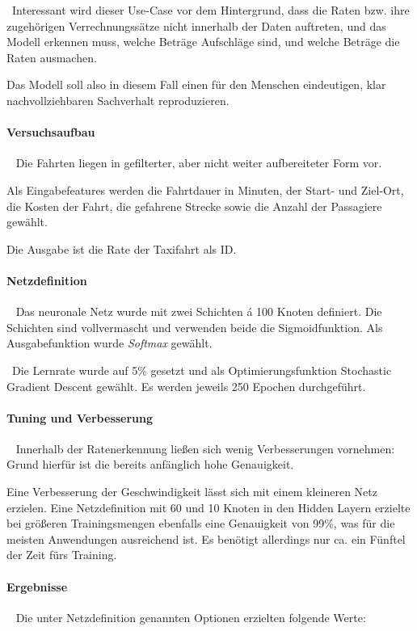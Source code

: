 ~\newline Interessant wird dieser Use-Case vor dem Hintergrund, dass die Raten bzw. ihre zugehörigen Verrechnungssätze nicht innerhalb der Daten auftreten, und das Modell erkennen muss, welche Beträge Aufschläge sind, und welche Beträge die Raten ausmachen. 

Das Modell soll also in diesem Fall einen für den Menschen eindeutigen, klar nachvollziehbaren Sachverhalt reproduzieren. 
\paragraph{Versuchsaufbau} ~\newline
Die Fahrten liegen in gefilterter, aber nicht weiter aufbereiteter Form vor. 

Als Eingabefeatures werden die Fahrtdauer in Minuten, der Start- und Ziel-Ort, die Kosten der Fahrt, die gefahrene Strecke sowie die Anzahl der Passagiere gewählt. 

Die Ausgabe ist die Rate der Taxifahrt als ID.
\paragraph{Netzdefinition} ~\newline
Das neuronale Netz wurde mit zwei Schichten á 100 Knoten definiert. Die Schichten sind vollvermascht und verwenden beide die Sigmoidfunktion. Als Ausgabefunktion wurde \textit{Softmax} gewählt.

~\newline Die Lernrate wurde auf 5\% gesetzt und als Optimierungsfunktion Stochastic Gradient Descent gewählt. Es werden jeweils 250 Epochen durchgeführt. 
\paragraph{Tuning und Verbesserung} ~\newline
Innerhalb der Ratenerkennung ließen sich wenig Verbesserungen vornehmen: Grund hierfür ist die bereits anfänglich hohe Genauigkeit. 

Eine Verbesserung der Geschwindigkeit lässt sich mit einem kleineren Netz erzielen. Eine Netzdefinition mit 60 und 10 Knoten in den Hidden Layern erzielte bei größeren Trainingsmengen ebenfalls eine Genauigkeit von 99\%, was für die meisten Anwendungen ausreichend ist. Es benötigt allerdings nur ca. ein Fünftel der Zeit fürs Training.
\paragraph{Ergebnisse} ~\newline
Die unter Netzdefinition genannten Optionen erzielten folgende Werte:

